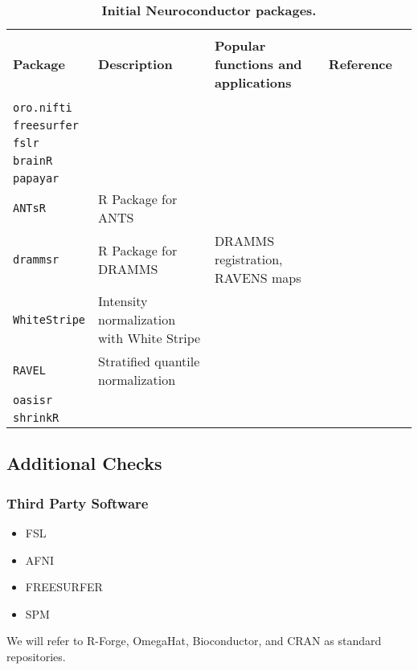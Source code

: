 \documentclass[]{elsarticle} %
\providecommand{\tightlist}{%
  \setlength{\itemsep}{0pt}\setlength{\parskip}{0pt}}
\begin{document}
\begin{table}[!ht]
\footnotesize
\centering
\caption{\textbf{Initial Neuroconductor packages.}}\label{tab:summary}
\begin{tabular}{lllcl}
\hline \\[-2ex]
\textbf{Package} & \textbf{Description} & \textbf{Popular functions and applications} & \textbf{Reference} \\
\hline \\ [-1.5ex]
\texttt{oro.nifti} &  &  & &   \\ [1ex]
\texttt{freesurfer} & &  & \\ [1ex]
 \texttt{fslr} &  & &   \\ [1ex]
 \texttt{brainR} &  &  &    \\ [1ex]
 \texttt{papayar} &  &  &    \\ [1ex]
   \texttt{ANTsR} & R Package for ANTS &   \\ [1ex]
  \texttt{drammsr} & R Package for DRAMMS & 
  DRAMMS registration, RAVENS maps  \\ [1ex]
 \texttt{WhiteStripe} & Intensity normalization with White Stripe & & &   \\ [1ex]
   \texttt{RAVEL} & Stratified quantile normalization &&&  \\ [1ex]
     \texttt{oasisr} &  &&&  \\ [1ex]
     \texttt{shrinkR} &  &&&  \\ [1ex]
\hline
\end{tabular}
\end{table}


\subsection{Additional Checks}\label{additional-checks}

\subsubsection{Third Party Software}\label{third-party-software}

\begin{itemize}
\tightlist
\item
  FSL
\item
  AFNI
\item
  FREESURFER
\item
  SPM
\end{itemize}

We will refer to R-Forge, OmegaHat, Bioconductor, and CRAN as standard
repositories.
\end{document}

